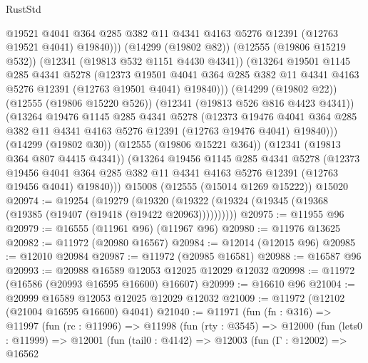 \begin{lexlean}{RustStd}
\begin{coremodule}
                @19521
                @4041
                @364
                @285
                @382
                @11
                @4341
                @4163
                @5276
                @12391
                (@12763 @19521 @4041)
                @19840)))
          (@14299 (@19802 @82))
          (@12555 (@19806 @15219 @532))
          (@12341 (@19813 @532 @1151 @4430 @4341))
          (@13264
            @19501
            @1145
            @285
            @4341
            @5278
            (@12373
              @19501
              @4041
              @364
              @285
              @382
              @11
              @4341
              @4163
              @5276
              @12391
              (@12763 @19501 @4041)
              @19840)))
        (@14299 (@19802 @22))
        (@12555 (@19806 @15220 @526))
        (@12341 (@19813 @526 @816 @4423 @4341))
        (@13264
          @19476
          @1145
          @285
          @4341
          @5278
          (@12373
            @19476
            @4041
            @364
            @285
            @382
            @11
            @4341
            @4163
            @5276
            @12391
            (@12763 @19476 @4041)
            @19840)))
      (@14299 (@19802 @30))
      (@12555 (@19806 @15221 @364))
      (@12341 (@19813 @364 @807 @4415 @4341))
      (@13264
        @19456
        @1145
        @285
        @4341
        @5278
        (@12373
          @19456
          @4041
          @364
          @285
          @382
          @11
          @4341
          @4163
          @5276
          @12391
          (@12763 @19456 @4041)
          @19840)))
    @15008
    (@12555 (@15014 @1269 @15222))
    @15020
@20974 := @19254
    (@19279 (@19320 (@19322 (@19324 (@19345 (@19368 (@19385 (@19407 (@19418 (@19422 @20963))))))))))
@20975 := @11955 @96
@20979 := @16555 (@11961 @96) (@11967 @96)
@20980 := @11976 @13625
@20982 := @11972 (@20980 @16567)
@20984 := @12014 (@12015 @96)
@20985 := @12010 @20984
@20987 := @11972 (@20985 @16581)
@20988 := @16587 @96
@20993 := @20988 @16589 @12053 @12025 @12029 @12032
@20998 := @11972 (@16586 (@20993 @16595 @16600) @16607)
@20999 := @16610 @96
@21004 := @20999 @16589 @12053 @12025 @12029 @12032
@21009 := @11972 (@12102 (@21004 @16595 @16600) @4041)
@21040 := @11971
    (fun (fn : @316) =>
    @11997
      (fun (rc : @11996) =>
      @11998
        (fun (rty : @3545) =>
        @12000
          (fun (lets0 : @11999) =>
          @12001
            (fun (tail0 : @4142) =>
            @12003
              (fun (Γ : @12002) =>
              @16562

\end{coremodule}
\end{lexlean}
